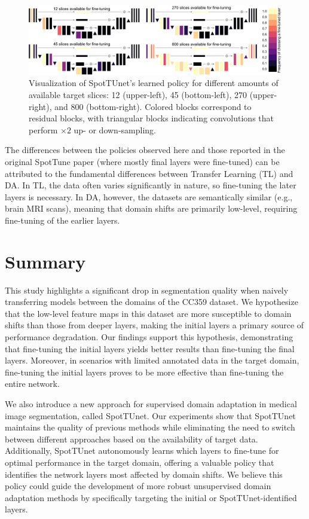 \begin{figure}[h!]
	\centering
	\includegraphics[width=\textwidth]{Dissertation/Figures/2_mri/layerwise_template.pdf}
	\caption{Visualization of SpotTUnet's learned policy for different amounts of available target slices: 12 (upper-left), 45 (bottom-left), 270 (upper-right), and 800 (bottom-right). Colored blocks correspond to residual blocks, with triangular blocks indicating convolutions that perform $\times 2$ up- or down-sampling.}
	\label{fig:layerswise_template}
\end{figure}

The differences between the policies observed here and those reported in the original SpotTune paper \cite{guo2019spottune} (where mostly final layers were fine-tuned) can be attributed to the fundamental differences between Transfer Learning (TL) and DA. In TL, the data often varies significantly in nature, so fine-tuning the later layers is necessary. In DA, however, the datasets are semantically similar (e.g., brain MRI scans), meaning that domain shifts are primarily low-level, requiring fine-tuning of the earlier layers.


\section{Summary}

This study highlights a significant drop in segmentation quality when naively transferring models between the domains of the CC359 dataset. We hypothesize that the low-level feature maps in this dataset are more susceptible to domain shifts than those from deeper layers, making the initial layers a primary source of performance degradation. Our findings support this hypothesis, demonstrating that fine-tuning the initial layers yields better results than fine-tuning the final layers. Moreover, in scenarios with limited annotated data in the target domain, fine-tuning the initial layers proves to be more effective than fine-tuning the entire network.

We also introduce a new approach for supervised domain adaptation in medical image segmentation, called SpotTUnet. Our experiments show that SpotTUnet maintains the quality of previous methods while eliminating the need to switch between different approaches based on the availability of target data. Additionally, SpotTUnet autonomously learns which layers to fine-tune for optimal performance in the target domain, offering a valuable policy that identifies the network layers most affected by domain shifts. We believe this policy could guide the development of more robust unsupervised domain adaptation methods by specifically targeting the initial or SpotTUnet-identified layers.


